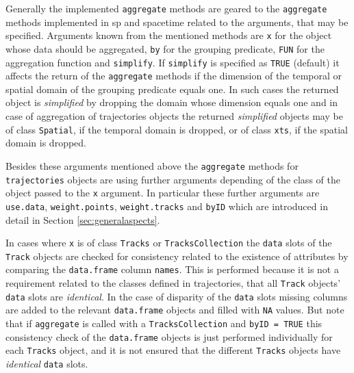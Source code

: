 \documentclass[12pt, oneside, a4paper]{scrbook}
\newcommand{\pkg}[1]{{\normalfont\fontseries{b}\selectfont #1}}
\let\code=\texttt
\begin{document}
Generally the implemented \code{aggregate} methods are geared to the \code{aggregate} methods implemented in \pkg{sp} and \pkg{spacetime} related to the arguments, that may be specified.
Arguments known from the mentioned methods are \code{x} for the object whose data should be aggregated, \code{by} for the grouping predicate, \code{FUN} for the aggregation function and \code{simplify}.
If \code{simplify} is specified as \code{TRUE} (default) it affects the return of the \code{aggregate} methods if the dimension of the temporal or spatial domain of the grouping predicate equals one.
In such cases the returned object is \textit{simplified} by dropping the domain whose dimension equals one and in case of aggregation of \pkg{trajectories} objects the returned \textit{simplified} objects may be of class \code{Spatial}, if the temporal domain is dropped, or of class \code{xts}, if the spatial domain is dropped.
\par\medskip

Besides these arguments mentioned above the \code{aggregate} methods for \code{trajectories} objects are using further arguments depending of the class of the object passed to the \code{x} argument. In particular these further arguments are \code{use.data}, \code{weight.points}, \code{weight.tracks} and \code{byID} which are introduced in detail in Section \ref{sec:generalaspects}.
\par\medskip

In cases where \code{x} is of class \code{Tracks} or \code{TracksCollection} the \code{data} slots of the \code{Track} objects are checked for consistency related to the existence of attributes by comparing the \code{data.frame} column \code{names}. This is performed because it is not a requirement related to the classes defined in \pkg{trajectories}, that all \code{Track} objects' \code{data} slots are \textit{identical}.
In the case of disparity of the \code{data} slots missing columns are added to the relevant \code{data.frame} objects and filled with \code{NA} values. 
But note that if \code{aggregate} is called with a \code{TracksCollection} and \code{byID = TRUE} this consistency check of the \code{data.frame} objects is just performed individually for each \code{Tracks} object, and it is not ensured that the different \code{Tracks} objects have \textit{identical} \code{data} slots.
\par\medskip
\end{document}
